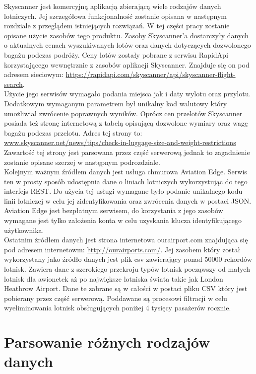 \documentclass[12pt, twoside]{report}
\begin{document}
Skyscanner jest komercyjną aplikacją zbierającą wiele rodzajów danych lotniczych. Jej szczegółowa funkcjonalność zostanie opisana w następnym rozdziale z przeglądem istniejących rozwiązań. W tej części pracy zostanie opisane użycie zasobów tego produktu. Zasoby Skyscanner'a dostarczyły danych o aktualnych cenach wyszukiwanych lotów oraz danych dotyczących dozwolonego bagażu podczas podróży. Ceny lotów zostały pobrane z serwisu RapidApi korzystającego wewnętrznie z zasobów aplikacji Skyscanner. Znajduje się on pod adresem sieciowym: \url{https://rapidapi.com/skyscanner/api/skyscanner-flight-search}.\\
Użycie jego serwisów wymagało podania miejsca jak i daty wylotu oraz przylotu. Dodatkowym wymaganym parametrem był unikalny kod walutowy który umożliwiał zwrócenie poprawnych wyników. Oprócz cen przelotów Skyscanner posiada też stronę internetową z tabelą opisującą dozwolone wymiary oraz wagę bagażu podczas przelotu. Adres tej strony to: \url{www.skyscanner.net/news/tips/check-in-luggage-size-and-weight-restrictions}\\
Zawartość tej strony jest parsowana przez część serwerową jednak to zagadnienie zostanie opisane szerzej w następnym podrozdziale.\\ \indent
Kolejnym ważnym źródłem danych jest usługa chmurowa Aviation Edge. Serwis ten w prosty sposób udostępnia dane o liniach lotniczych wykorzystując do tego interfejs REST. Do użycia tej usługi wymagane było podanie unikalnego kodu linii lotniczej w celu jej zidentyfikowania oraz zwrócenia danych w postaci JSON. Aviation Edge jest bezpłatnym serwisem, do korzystania z jego zasobów wymagane jest tylko założenia konta w celu uzyskania klucza identyfikującego użytkownika. \\ \indent
Ostatnim źródłem danych jest strona internetowa ourairport.com znajdująca się pod adresem internetowm: \url{http://ourairports.com/}. Jej zasobem który został wykorzystany jako źródło danych jest plik csv zawierający ponad 50000 rekordów lotnisk. Zawiera dane z szerokiego przekroju typów lotnisk począwszy od małych lotnisk dla awionetek aż po największe lotniska świata takie jak London Heathrow Airport. Dane te zabrane są w całości w postaci pliku CSV który jest pobierany przez część serwerową. Poddawane są procesowi filtracji w celu wyeliminowania lotnisk obsługujących poniżej 4 tysięcy pasażerów rocznie.




\newpage
\section{Parsowanie różnych rodzajów danych}
\end{document}
